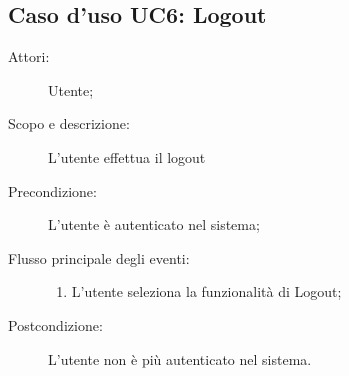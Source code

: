 \subsection{Caso d'uso UC6: Logout}\begin{description}
\item[Attori:] Utente;
\item[Scopo e descrizione:] L'utente effettua il logout
      \item[Precondizione:] L'utente è autenticato nel sistema;

        \item[Flusso principale degli eventi:] \begin{enumerate}
          \item L'utente seleziona la funzionalità di Logout;

      \end{enumerate}
    \item[Postcondizione:] L'utente non è più autenticato nel sistema.
  \end{description}
\hypertarget{UC7}{}
